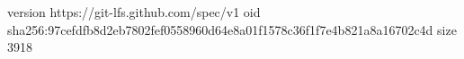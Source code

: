 version https://git-lfs.github.com/spec/v1
oid sha256:97cefdfb8d2eb7802fef0558960d64e8a01f1578c36f1f7e4b821a8a16702c4d
size 3918
